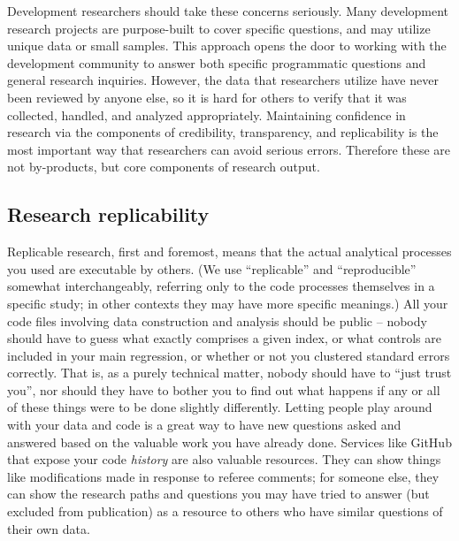 Development researchers should take these concerns seriously.
Many development research projects are purpose-built to cover specific questions,
and may utilize unique data or small samples.
This approach opens the door to working with the development community
to answer both specific programmatic questions and general research inquiries.
However, the data that researchers utilize have never been reviewed by anyone else,
so it is hard for others to verify that it was collected, handled, and analyzed appropriately.
Maintaining confidence in research via the components of credibility, transparency, and replicability
is the most important way that researchers can avoid serious errors. 
Therefore these are not by-products, but core components of research output.

\subsection{Research replicability}

Replicable research, first and foremost,
means that the actual analytical processes you used are executable by others.\cite{dafoe2014science}
(We use ``replicable'' and ``reproducible'' somewhat interchangeably,
referring only to the code processes themselves in a specific study;
in other contexts they may have more specific meanings.)
All your code files involving data construction and analysis
should be public -- nobody should have to guess what exactly comprises a given index,
or what controls are included in your main regression,
or whether or not you clustered standard errors correctly.
That is, as a purely technical matter, nobody should have to ``just trust you'',
nor should they have to bother you to find out what happens
if any or all of these things were to be done slightly differently.\cite{simmons2011false,wicherts2016degrees}
Letting people play around with your data and code is a great way to have new questions asked and answered
based on the valuable work you have already done.
Services like GitHub that expose your code \textit{history}
are also valuable resources. They can show things like modifications
made in response to referee comments; for someone else, they can show
the research paths and questions you may have tried to answer
(but excluded from publication)
as a resource to others who have similar questions of their own data.

